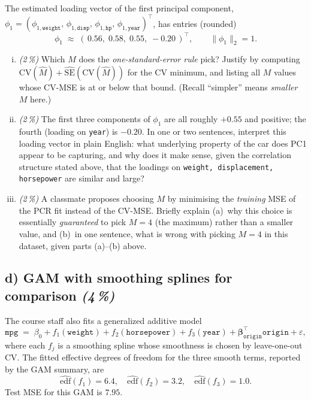 \documentclass[11pt,a4paper]{article}
\newcommand{\subpoints}[1]{\textit{(#1\,\%)}}
\begin{document}
The estimated loading vector of the first principal component, $\phi_1 = (\phi_{1,\texttt{weight}},\, \phi_{1,\texttt{disp}},\, \phi_{1,\texttt{hp}},\, \phi_{1,\texttt{year}})^\top$, has entries (rounded)
$$\phi_1 \;\approx\; (\,0.56,\; 0.58,\; 0.55,\; -0.20\,)^\top, \qquad \|\phi_1\|_2 = 1.$$

\begin{enumerate}[(i)]
  \item \subpoints{2} Which $M$ does the \emph{one-standard-error rule} pick? Justify by computing $\mathrm{CV}(\hat M) + \widehat{\mathrm{SE}}(\mathrm{CV}(\hat M))$ for the CV minimum, and listing all $M$ values whose CV-MSE is at or below that bound. (Recall ``simpler'' means \emph{smaller} $M$ here.)

  \item \subpoints{2} The first three components of $\phi_1$ are all roughly $+0.55$ and positive; the fourth (loading on \texttt{year}) is $-0.20$. In one or two sentences, interpret this loading vector in plain English: what underlying property of the car does PC1 appear to be capturing, and why does it make sense, given the correlation structure stated above, that the loadings on \texttt{weight, displacement, horsepower} are similar and large?

  \item \subpoints{2} A classmate proposes choosing $M$ by minimising the \emph{training} MSE of the PCR fit instead of the CV-MSE. Briefly explain (a)~why this choice is essentially \emph{guaranteed} to pick $M = 4$ (the maximum) rather than a smaller value, and (b)~in one sentence, what is wrong with picking $M = 4$ in this dataset, given parts (a)--(b) above.
\end{enumerate}

\subsection*{d) GAM with smoothing splines for comparison \subpoints{4}}

The course staff also fits a generalized additive model
$$\texttt{mpg} \;=\; \beta_0 + f_1(\texttt{weight}) + f_2(\texttt{horsepower}) + f_3(\texttt{year}) + \boldsymbol\beta_{\texttt{origin}}^\top \texttt{origin} + \varepsilon,$$
where each $f_j$ is a smoothing spline whose smoothness is chosen by leave-one-out CV. The fitted effective degrees of freedom for the three smooth terms, reported by the GAM summary, are
$$\widehat{\mathrm{edf}}(f_1) = 6.4,\quad \widehat{\mathrm{edf}}(f_2) = 3.2,\quad \widehat{\mathrm{edf}}(f_3) = 1.0.$$
Test MSE for this GAM is $7.95$.
\end{document}
